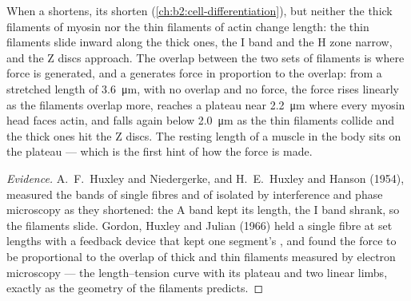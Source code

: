\begin{proposition}\label{prop:b2:muscle-movement:sliding}
When a  shortens, its  shorten
(\cref{ch:b2:cell-differentiation}), but neither the thick filaments
of myosin nor the thin filaments of actin change length: the thin
filaments slide inward along the thick ones, the I band and the H
zone narrow, and the Z discs approach. The overlap between the two
sets of filaments is where force is generated, and a 
generates force in proportion to the overlap: from a stretched
length of \qty{3.6}{\micro m}, with no overlap and no force, the
force rises linearly as the filaments overlap more, reaches a
plateau near \qty{2.2}{\micro m} where every myosin head faces actin,
and falls again below \qty{2.0}{\micro m} as the thin filaments
collide and the thick ones hit the Z discs. The resting length of a
muscle in the body sits on the plateau --- which is the first hint
of how the force is made.
\end{proposition}
\begin{proof}[Evidence]
A.~F.~Huxley and Niedergerke, and H.~E.~Huxley and Hanson (1954),
measured the bands of single fibres and of isolated  by
interference and phase microscopy as they shortened: the A band kept
its length, the I band shrank, so the filaments slide. Gordon,
Huxley and Julian (1966) held a single fibre at set lengths with a
feedback device that kept one segment's  ,
and found the force to be proportional to the overlap of thick and
thin filaments measured by electron microscopy --- the length--tension
curve with its plateau and two linear limbs, exactly as the geometry
of the filaments predicts.
\end{proof}

